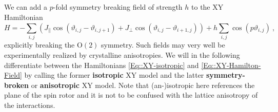 	We can add a $p$-fold symmetry breaking field of strength $h$ to the XY Hamiltonian
	\begin{equation} \label{Eq::XY-Hamilton-Field}
		H =- \sum_{i,j}^{} \left(J_\parallel  \cos \left(\vartheta_{i,j} - \vartheta_{i, j+1} \right) + J_\perp  \cos \left(\vartheta_{i,j} - \vartheta_{i+1, j} \right) \right)	+ h \sum_{i,j} \cos(p\vartheta_{i,j}) ~,
	\end{equation}
	explicitly breaking the $\text{O}(2)$ symmetry. Such fields may very well be experimentally realized by crystalline anisotropies. We will in the following differentiate between the Hamiltonians \eqref{Eq::XY-isotropic} and \eqref{Eq::XY-Hamilton-Field} by calling the former \textbf{isotropic} XY model and the latter \textbf{symmetry-broken} or \textbf{anisotropic} XY model. Note that (an-)isotropic here references the plane of the spin rotor and it is not to be confused with the lattice anisotropy of the interactions. \\
	
